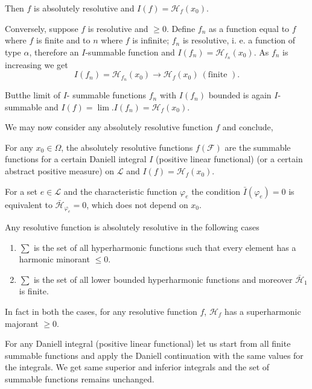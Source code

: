 Then $f$ is absolutely resolutive and $I(f) = \mathscr{H}_f (x_0)$.

Conversely, suppose $f$ is resolutive and $\geq 0$. Define $f_n$ as a
function equal to $f$ where $f$ is finite and to $n$ where $f$ is
infinite; $f_n$ is resolutive, i. e. a function of type $\alpha$,
therefore an $I$-summable function and
$I(f_n)=\mathscr{H}_{f_n}(x_0)$. As $f_n$ is increasing we get 
$$
I(f_n) = \mathscr{H}_{f_n} (x_0) \to \mathscr{H}_f (x_0)~ (\text{
  finite }). 
$$

But\pageoriginale the limit of $I$- summable functions $f_n$ with $I(f_n)$ bounded
is again $I$-summable and $I(f) = \lim. I(f_n) = \mathscr{H}_f(x_0)$. 

We may now consider any absolutely resolutive function $f$ and conclude,
\setcounter{thm}{17}
\begin{thm}\label{p4:chap5:sec25:thm18}%
  For any $x_0 \in \Omega$, the absolutely resolutive functions
  $f(\mathcal{F})$ are the summable functions for a certain Daniell
  integral $I$ (positive linear functional) (or a certain abstract
  positive measure) on $\mathscr{L}$ and $I (f) = \mathscr{H}_f(x_0)$. 
\end{thm}

\begin{coro*}
  For a set $e \in \mathscr{L}$ and the characteristic function
  $\varphi_e$ the condition $\bar{I}(\varphi_e) = 0$ is equivalent to
  $\bar{\mathscr{H}}_{\varphi_e} = 0$, which does not depend on
  $x_0$. 
\end{coro*}

\setcounter{prop}{14}
\begin{prop}\label{p4:chap5:sec25:prop15}%
  Any resolutive function is absolutely resolutive in the following cases
  \begin{enumerate}[\rm(i)]
  \item $\sum $ is the set of all hyperharmonic functions such that
    every element has a harmonic minorant $\leq 0$. 
  \item $\sum$ is the set of all lower bounded hyperharmonic functions
    and moreover $\bar{\mathscr{H}}_1$ is finite. 
  \end{enumerate}
\end{prop}

In fact in both the cases, for any resolutive function $f$,
$\mathscr{H}_f$ has a superharmonic majorant $\geq 0$. 
\setcounter{remark}{0}
\begin{remark}%
  For any Daniell integral (positive linear functional) let us start
  from all finite summable functions and apply the Daniell
  continuation with the same values for the integrals. We get same
  superior and inferior integrals and the set of summable functions
  remains unchanged.\pageoriginale 
\end{remark}

